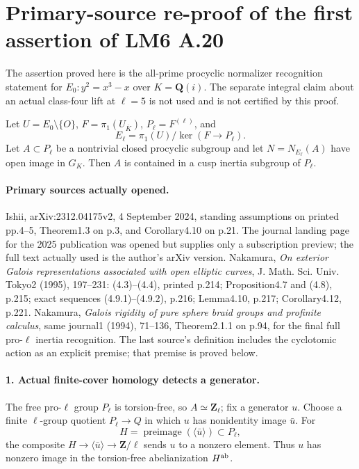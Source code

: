 \section*{Primary-source re-proof of the first assertion of LM6 A.20}
The assertion proved here is the all-prime procyclic normalizer recognition statement for $E_0:y^2=x^3-x$ over $K=\mathbf Q(i)$. The separate integral claim about an actual class-four lift at $\ell=5$ is not used and is not certified by this proof.

Let $U=E_0\setminus\{O\}$, $F=\pi_1(U_{\overline K})$, $P_\ell=F^{(\ell)}$, and
\[
 E_\ell=\pi_1(U)/\ker(F\to P_\ell).
\]
Let $A\subset P_\ell$ be a nontrivial closed procyclic subgroup and let $N=N_{E_\ell}(A)$ have open image in $G_K$. Then $A$ is contained in a cusp inertia subgroup of $P_\ell$.

\paragraph{Primary sources actually opened.}
Ishii, arXiv:2312.04175v2, 4 September 2024, standing assumptions on printed pp.4--5, Theorem1.3 on p.3, and Corollary4.10 on p.21. The journal landing page for the 2025 publication was opened but supplies only a subscription preview; the full text actually used is the author's arXiv version. Nakamura, \emph{On exterior Galois representations associated with open elliptic curves}, J. Math. Sci. Univ. Tokyo2 (1995), 197--231: (4.3)--(4.4), printed p.214; Proposition4.7 and (4.8), p.215; exact sequences (4.9.1)--(4.9.2), p.216; Lemma4.10, p.217; Corollary4.12, p.221. Nakamura, \emph{Galois rigidity of pure sphere braid groups and profinite calculus}, same journal1 (1994), 71--136, Theorem2.1.1 on p.94, for the final full pro-$\ell$ inertia recognition. The last source's definition includes the cyclotomic action as an explicit premise; that premise is proved below.

\paragraph{1. Actual finite-cover homology detects a generator.}
The free pro-$\ell$ group $P_\ell$ is torsion-free, so $A\simeq\mathbf Z_\ell$; fix a generator $u$. Choose a finite $\ell$-group quotient $P_\ell\to Q$ in which $u$ has nonidentity image $\bar u$. For
\[
 H=\operatorname{preimage}(\langle\bar u\rangle)\subset P_\ell,
\]
the composite $H\to\langle\bar u\rangle\to\mathbf Z/\ell$ sends $u$ to a nonzero element. Thus $u$ has nonzero image in the torsion-free abelianization $H^{\rm ab}$.

